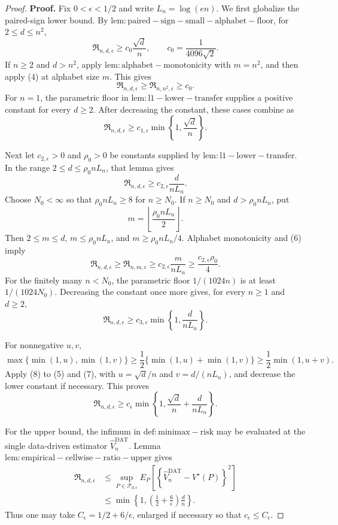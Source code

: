 \documentclass{article}
\begin{document}
\begin{proof}
\textbf{Proof.}
Fix \(0<\epsilon<1/2\) and write \(L_n=\log(en)\).  We first globalize the paired-sign lower bound.  By \(\mathrm{lem:paired-sign-small-alphabet-floor}\), for \(2\le d\le n^2\),
\[
 \mathfrak R_{n,d,\epsilon}\ge c_0\frac{\sqrt d}{n},
 \qquad c_0=\frac1{4096\sqrt2}.
\tag{4}
\]
If \(n\ge2\) and \(d>n^2\), apply \(\mathrm{lem:alphabet-monotonicity}\) with \(m=n^2\), and then apply (4) at alphabet size \(m\).  This gives
\[
 \mathfrak R_{n,d,\epsilon}
 \ge\mathfrak R_{n,n^2,\epsilon}\ge c_0.
\]
For \(n=1\), the parametric floor in \(\mathrm{lem:l1-lower-transfer}\) supplies a positive constant for every \(d\ge2\).  After decreasing the constant, these cases combine as
\[
 \mathfrak R_{n,d,\epsilon}
 \ge c_{1,\epsilon}\min\!\left\{1,\frac{\sqrt d}{n}\right\}.
\tag{5}
\]

Next let \(c_{2,\epsilon}>0\) and \(\rho_0>0\) be constants supplied by \(\mathrm{lem:l1-lower-transfer}\).  In the range \(2\le d\le\rho_0nL_n\), that lemma gives
\[
 \mathfrak R_{n,d,\epsilon}
 \ge c_{2,\epsilon}\frac d{nL_n}.
\tag{6}
\]
Choose \(N_0<\infty\) so that \(\rho_0nL_n\ge8\) for \(n\ge N_0\).  If \(n\ge N_0\) and \(d>\rho_0nL_n\), put
\[
 m=\left\lfloor\frac{\rho_0nL_n}{2}\right\rfloor.
\]
Then \(2\le m\le d\), \(m\le\rho_0nL_n\), and \(m\ge\rho_0nL_n/4\).  Alphabet monotonicity and (6) imply
\[
 \mathfrak R_{n,d,\epsilon}
 \ge\mathfrak R_{n,m,\epsilon}
 \ge c_{2,\epsilon}\frac m{nL_n}
 \ge\frac{c_{2,\epsilon}\rho_0}{4}.
\]
For the finitely many \(n<N_0\), the parametric floor \(1/(1024n)\) is at least \(1/(1024N_0)\).  Decreasing the constant once more gives, for every \(n\ge1\) and \(d\ge2\),
\[
 \mathfrak R_{n,d,\epsilon}
 \ge c_{3,\epsilon}\min\!\left\{1,\frac d{nL_n}\right\}.
\tag{7}
\]

For nonnegative \(u,v\),
\[
 \max\{\min(1,u),\min(1,v)\}
 \ge\frac12\{\min(1,u)+\min(1,v)\}
 \ge\frac12\min(1,u+v).
\tag{8}
\]
Apply (8) to (5) and (7), with \(u=\sqrt d/n\) and \(v=d/(nL_n)\), and decrease the lower constant if necessary.  This proves
\[
 \mathfrak R_{n,d,\epsilon}
 \ge c_\epsilon\min\!\left\{1,
   \frac{\sqrt d}{n}+\frac d{nL_n}
 \right\}.
\tag{9}
\]

For the upper bound, the infimum in \(\mathrm{def:minimax-risk}\) may be evaluated at the single data-driven estimator \(\widehat V_n^{\mathrm{DAT}}\).  Lemma \(\mathrm{lem:empirical-cellwise-ratio-upper}\) gives
\[
 \begin{aligned}
 \mathfrak R_{n,d,\epsilon}
 &\le\sup_{P\in\mathcal P_{d,\epsilon}}
 E_P\!\left[
   \left\{\widehat V_n^{\mathrm{DAT}}-V^\star(P)\right\}^2
 \right]\\
 &\le\min\!\left\{1,
  \left(\frac12+\frac6\epsilon\right)\frac dn
 \right\}.
\tag{10}
 \end{aligned}
\]
Thus one may take \(C_\epsilon=1/2+6/\epsilon\), enlarged if necessary so that \(c_\epsilon\le C_\epsilon\).


\end{proof}
\end{document}
